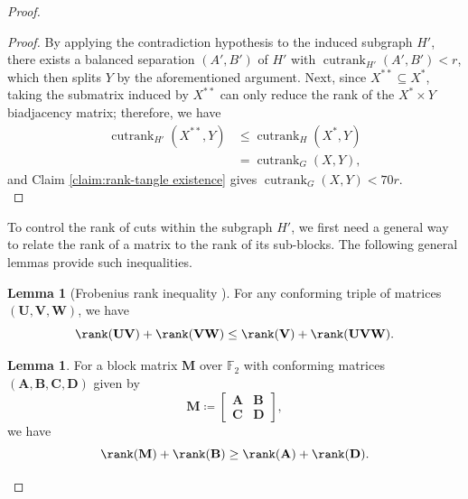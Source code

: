 \documentclass{article}
\theoremstyle{definition}
\newtheorem{lemma}[theorem]{Lemma}
\begin{document}
\begin{proof}
\begin{proof}
    By applying the contradiction hypothesis to the induced subgraph $H'$, there exists a balanced separation $(A', B')$ of $H'$ with $\operatorname{cutrank}_{H'}(A', B') < r$, which then splits $Y$ by the aforementioned argument. Next, since $X^{**}\subseteq X^*$, taking the submatrix induced by $X^{**}$ can only reduce the rank of the $X^*\times Y$ biadjacency matrix; therefore, we have
    \begin{align*}
        \operatorname{cutrank}_{H'}(X^{**}, Y) &\leq \operatorname{cutrank}_H(X^*, Y) \\
        &= \operatorname{cutrank}_G(X,Y),
    \end{align*}
    and Claim \ref{claim:rank-tangle existence} gives $\operatorname{cutrank}_G(X, Y) < 70r$.\qedhere\\
    \end{proof}

\noindent To control the rank of cuts within the subgraph $H'$, we first need a general way to relate the rank of a matrix to the rank of its sub-blocks. The following general lemmas provide such inequalities.\\

\begin{lemma}[Frobenius rank inequality \cite{doi:10.1137/1.9781611977448}] \label{lemma: matrix block inequality}
    For any conforming triple of matrices $(\mathbf{U}, \mathbf{V}, \mathbf{W})$, we have \[\rank(\mathbf{U}\mathbf{V}) + \rank(\mathbf{V}\mathbf{W}) \leq \rank(\mathbf{V}) + \rank(\mathbf{U}\mathbf{V}\mathbf{W}).\]
\end{lemma}

\begin{lemma}\label{lemma: matrix block rank inequality}
For a block matrix $\mathbf{M}$ over $\mathbb{F}_2$ with conforming matrices $(\mathbf{A}, \mathbf{B}, \mathbf{C}, \mathbf{D})$ given by \[\mathbf{M} \coloneqq
\begin{bmatrix}
\mathbf{A} & \mathbf{B}\\ \mathbf{C} & \mathbf{D}
\end{bmatrix},
\] we have \[\rank(\mathbf{M}) + \rank(\mathbf{B}) \geq \rank(\mathbf{A}) + \rank(\mathbf{D}).\]
\end{lemma}


\end{proof}
\end{document}
